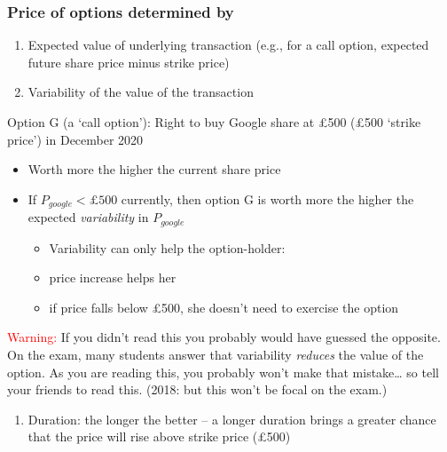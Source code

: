 \documentclass[]{article}
\providecommand{\tightlist}{%
  \setlength{\itemsep}{0pt}\setlength{\parskip}{0pt}}
\begin{document}
\hypertarget{price-of-options-determined-by}{%
\subsubsection{Price of options determined
by}\label{price-of-options-determined-by}}

\begin{enumerate}
\def\labelenumi{\arabic{enumi}.}
\item
  Expected value of underlying transaction (e.g., for a call option,
  expected future share price minus strike price)
\item
  Variability of the value of the transaction
\end{enumerate}

Option G (a `call option'): Right to buy Google share at £500 (£500
`strike price') in December 2020

\begin{itemize}
\item
  Worth more the higher the current share price
\item
  If \(P_{google}<\pounds 500\) currently, then option G is worth more
  the higher the expected \emph{variability} in \(P_{google}\)

  \begin{itemize}
  \tightlist
  \item
    Variability can only help the option-holder:
  \item
    price increase helps her
  \item
    if price falls below \pounds 500, she doesn't need to exercise the
    option
  \end{itemize}
\end{itemize}

\textcolor{red}{Warning:} If you didn't read this you probably would
have guessed the opposite. On the exam, many students answer that
variability \emph{reduces} the value of the option. As you are reading
this, you probably won't make that mistake\ldots{} so tell your friends
to read this. (2018: but this won't be focal on the exam.)

\bigskip

\begin{enumerate}
\def\labelenumi{\arabic{enumi}.}
\setcounter{enumi}{2}
\tightlist
\item
  Duration: the longer the better -- a longer duration brings a greater
  chance that the price will rise above strike price (£500)
\end{enumerate}
\end{document}
